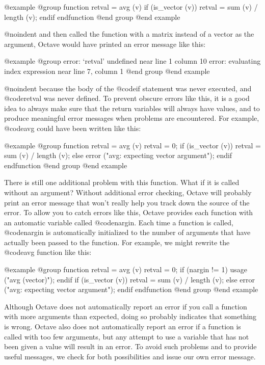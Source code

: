 @example
@group
function retval = avg (v)
  if (is_vector (v))
    retval = sum (v) / length (v);
  endif
endfunction
@end group
@end example

@noindent
and then called the function with a matrix instead of a vector as the
argument, Octave would have printed an error message like this:

@example
@group
error: `retval' undefined near line 1 column 10
error: evaluating index expression near line 7, column 1
@end group
@end example

@noindent
because the body of the @code{if} statement was never executed, and
@code{retval} was never defined.  To prevent obscure errors like this,
it is a good idea to always make sure that the return variables will
always have values, and to produce meaningful error messages when
problems are encountered.  For example, @code{avg} could have been
written like this:

@example
@group
function retval = avg (v)
  retval = 0;
  if (is_vector (v))
    retval = sum (v) / length (v);
  else
    error ("avg: expecting vector argument");
  endif
endfunction
@end group
@end example

There is still one additional problem with this function.  What if it is
called without an argument?  Without additional error checking, Octave
will probably print an error message that won't really help you track
down the source of the error.  To allow you to catch errors like this,
Octave provides each function with an automatic variable called
@code{nargin}.  Each time a function is called, @code{nargin} is
automatically initialized to the number of arguments that have actually
been passed to the function.  For example, we might rewrite the
@code{avg} function like this:

@example
@group
function retval = avg (v)
  retval = 0;
  if (nargin != 1)
    usage ("avg (vector)");
  endif
  if (is_vector (v))
    retval = sum (v) / length (v);
  else
    error ("avg: expecting vector argument");
  endif
endfunction
@end group
@end example

Although Octave does not automatically report an error if you call a
function with more arguments than expected, doing so probably indicates
that something is wrong.  Octave also does not automatically report an
error if a function is called with too few arguments, but any attempt to
use a variable that has not been given a value will result in an error.
To avoid such problems and to provide useful messages, we check for both
possibilities and issue our own error message.

